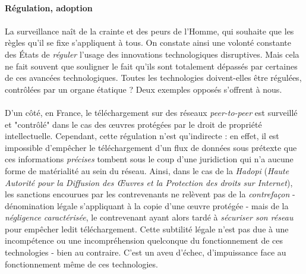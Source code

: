 \paragraph{Régulation, adoption}

\paragraph{} La surveillance naît de la crainte et des peurs de l'Homme, qui souhaite que les règles qu'il se fixe 
s'appliquent à tous. On constate ainsi une volonté constante des États de \emph{réguler} l'usage des innovations technologiques
disruptives. Mais cela ne fait souvent que souligner le fait qu'ils sont totalement dépassés par certaines de ces 
avancées technologiques. Toutes les technologies doivent-elles être régulées, contrôlées par un organe étatique ? Deux 
exemples opposés s'offrent à nous. 

\paragraph{} D'un côté, en France, le téléchargement sur des réseaux \emph{peer-to-peer} est surveillé et "contrôlé" 
dans le cas des \oe{}uvres protégées par le droit de propriété intellectuelle. Cependant, cette régulation n'est qu'indirecte :
en effet, il est impossible d'empêcher le téléchargement d'un flux de données sous prétexte que ces informations \emph{précises}
tombent sous le coup d'une juridiction qui n'a aucune forme de matérialité au sein du réseau. Ainsi, dans le cas de la
\emph{Hadopi} (\emph{Haute Autorité pour la Diffusion des \OE{}uvres et la Protection des droits sur Internet}), les sanctions
encourues par les contrevenants ne relèvent pas de la \emph{contrefaçon} - dénomination légale s'appliquant à la copie d'une
\oe{}uvre protégée - mais de la \emph{négligence caractérisée}, le contrevenant ayant alors tardé à \emph{sécuriser son
réseau} pour empêcher ledit téléchargement. Cette subtilité légale n'est pas due à une incompétence ou une incompréhension
quelconque du fonctionnement de ces technologies - bien au contraire. C'est un aveu d'échec, d'impuissance face au fonctionnement
même de ces technologies.

